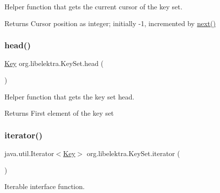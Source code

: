 Helper function that gets the current cursor of the key set. 

\begin{DoxyReturn}{Returns}
Cursor position as integer; initially -\/1, incremented by \hyperlink{classorg_1_1libelektra_1_1KeySet_a92aa593320132e4272602dda29aee2c7}{next()} 
\end{DoxyReturn}
\mbox{\label{classorg_1_1libelektra_1_1KeySet_a11ba1ef1213a9f1ac5743491bc7154e5}} 
\subsubsection{\texorpdfstring{head()}{head()}}
{\footnotesize\ttfamily \hyperlink{classorg_1_1libelektra_1_1Key}{Key} org.\+libelektra.\+Key\+Set.\+head (\begin{DoxyParamCaption}{ }\end{DoxyParamCaption})\hspace{0.3cm}{\ttfamily [inline]}}



Helper function that gets the key set head. 

\begin{DoxyReturn}{Returns}
First element of the key set 
\end{DoxyReturn}
\mbox{\label{classorg_1_1libelektra_1_1KeySet_ac7ef2aa30918b5790cbba04b4fe70073}} 
\subsubsection{\texorpdfstring{iterator()}{iterator()}}
{\footnotesize\ttfamily java.\+util.\+Iterator$<$\hyperlink{classorg_1_1libelektra_1_1Key}{Key}$>$ org.\+libelektra.\+Key\+Set.\+iterator (\begin{DoxyParamCaption}{ }\end{DoxyParamCaption})\hspace{0.3cm}{\ttfamily [inline]}}



Iterable interface function. 

